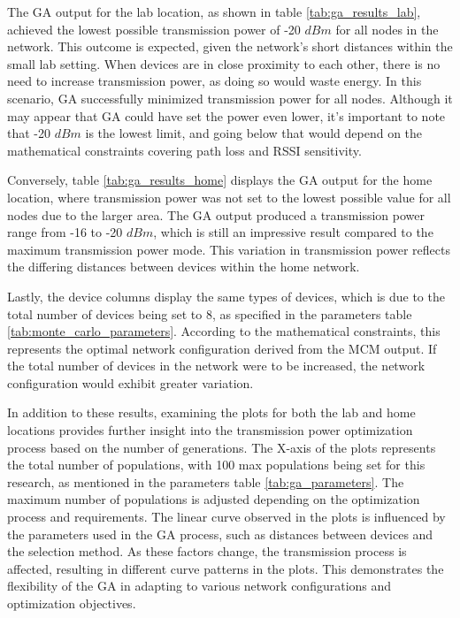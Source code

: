 The \acrlong{GA} output for the lab location, as shown in table \ref{tab:ga_results_lab}, achieved the lowest possible transmission power of -20 $dBm$ for all nodes in the network. This outcome is expected, given the network's short distances within the small lab setting. When devices are in close proximity to each other, there is no need to increase transmission power, as doing so would waste energy. In this scenario, \gls{GA} successfully minimized transmission power for all nodes. Although it may appear that \gls{GA} could have set the power even lower, it's important to note that -20 $dBm$ is the lowest limit, and going below that would depend on the mathematical constraints covering path loss and \gls{RSSI} sensitivity.

Conversely, table \ref{tab:ga_results_home} displays the \gls{GA} output for the home location, where transmission power was not set to the lowest possible value for all nodes due to the larger area. The \gls{GA} output produced a transmission power range from -16 to -20 $dBm$, which is still an impressive result compared to the maximum transmission power mode. This variation in transmission power reflects the differing distances between devices within the home network.

Lastly, the device columns display the same types of devices, which is due to the total number of devices being set to 8, as specified in the parameters table \ref{tab:monte_carlo_parameters}. According to the mathematical constraints, this represents the optimal network configuration derived from the \gls{MCM} output. If the total number of devices in the network were to be increased, the network configuration would exhibit greater variation.

In addition to these results, examining the plots for both the lab and home locations provides further insight into the transmission power optimization process based on the number of generations. The X-axis of the plots represents the total number of populations, with 100 max populations being set for this research, as mentioned in the parameters table \ref{tab:ga_parameters}. The maximum number of populations is adjusted depending on the optimization process and requirements. The linear curve observed in the plots is influenced by the parameters used in the \gls{GA} process, such as distances between devices and the selection method. As these factors change, the transmission process is affected, resulting in different curve patterns in the plots. This demonstrates the flexibility of the \gls{GA} in adapting to various network configurations and optimization objectives.

